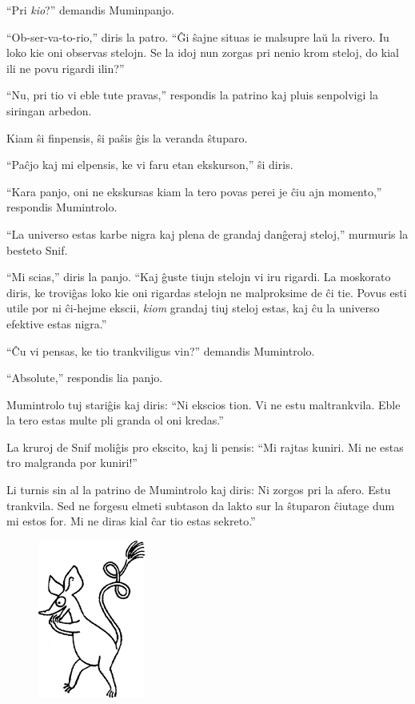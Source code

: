 ``Pri \emph{kio}?'' demandis Muminpanjo.

``Ob-ser-va-to-rio,'' diris la patro. ``Ĝi ŝajne situas ie malsupre laŭ la rivero. Iu loko kie oni observas stelojn. Se la idoj nun zorgas pri nenio krom steloj, do kial ili ne povu rigardi ilin?''

``Nu, pri tio vi eble tute pravas,'' respondis la patrino kaj pluis senpolvigi la siringan arbedon.

Kiam ŝi finpensis, ŝi paŝis ĝis la veranda ŝtuparo.

``Paĉjo kaj mi elpensis, ke vi faru etan ekskurson,'' ŝi diris.

``Kara panjo, oni ne ekskursas kiam la tero povas perei je ĉiu ajn momento,'' respondis Mumintrolo.

``La universo estas karbe nigra kaj plena de grandaj danĝeraj steloj,'' murmuris la besteto Snif.

``Mi scias,'' diris la panjo. ``Kaj ĝuste tiujn stelojn vi iru rigardi. La moskorato diris, ke troviĝas loko kie oni rigardas stelojn ne malproksime de ĉi tie. Povus esti utile por ni ĉi-hejme ekscii, \emph{kiom} grandaj tiuj steloj estas, kaj ĉu la universo efektive estas nigra.''

``Ĉu vi pensas, ke tio trankviligus vin?'' demandis Mumintrolo.

``Absolute,'' respondis lia panjo.

Mumintrolo tuj stariĝis kaj diris: ``Ni ekscios tion. Vi ne estu maltrankvila. Eble la tero estas multe pli granda ol oni kredas.''

La kruroj de Snif moliĝis pro ekscito, kaj li pensis: ``Mi rajtas kuniri. Mi ne estas tro malgranda por kuniri!''

Li turnis sin al la patrino de Mumintrolo kaj diris: Ni zorgos pri la afero. Estu trankvila. Sed ne forgesu elmeti subtason da lakto sur la ŝtuparon ĉiutage dum mi estos for. Mi ne diras kial ĉar tio estas sekreto.''

\begin{figure}[htbp]
\centering
\includegraphics[width=100pt,height=147pt]{2-3.png}
\caption{}
\label{2-3}
\end{figure}


